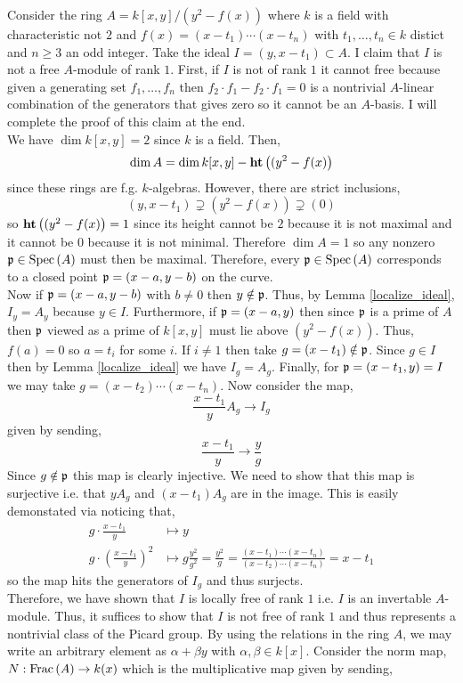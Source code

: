 \documentclass[12pt]{article}
\begin{document}
Consider the ring $A = k[x,y] / (y^2 - f(x))$ where $k$ is a field with characteristic not $2$ and $f(x) = (x - t_1) \cdots (x - t_n)$ with $t_1, \dots, t_n \in k$ distict and $n \ge 3$ an odd integer. Take the ideal $I = (y, x - t_1) \subset A$. I claim that $I$ is not a free $A$-module of rank $1$. First, if $I$ is not of rank $1$ it cannot free because given a generating set $f_1, \dots, f_n$ then $f_2 \cdot f_1 - f_2 \cdot f_1 = 0$ is a nontrivial $A$-linear combination of the generators that gives zero so it cannot be an $A$-basis. I will complete the proof of this claim at the end.
\bigskip\\
We have $\dim{k[x,y]} = 2$ since $k$ is a field. Then, 
\[ \dim{A} = \dim{k[x,y]} - \mathbf{ht}\left( (y^2 - f(x) \right) \]
since these rings are f.g. $k$-algebras. However, there are strict inclusions,
\[ (y, x - t_1) \supsetneq (y^2 - f(x)) \supsetneq (0) \]
so $\mathbf{ht}\left( (y^2 - f(x) \right) = 1$ since its height cannot be $2$ because it is not maximal and it cannot be $0$ because it is not minimal. Therefore $\dim{A} = 1$ so any nonzero $\mathfrak{p} \in \mathrm{Spec}\left( A \right)$ must then be maximal. Therefore, every $\mathfrak{p} \in \mathrm{Spec}\left( A \right)$ corresponds to a closed point $\mathfrak{p} = (x - a, y - b)$ on the curve. 
\bigskip\\
Now if $\mathfrak{p} = (x - a, y - b)$ with $b \neq 0$ then $y \notin \mathfrak{p}$. Thus, by Lemma \ref{localize_ideal}, $I_y = A_y$ because $y \in I$. Furthermore, if $\mathfrak{p} = (x - a, y)$ then since $\mathfrak{p}$ is a prime of $A$ then $\mathfrak{p}$ viewed as a prime of $k[x,y]$ must lie above $(y^2 - f(x))$. Thus, $f(a) = 0$ so $a = t_i$ for some $i$. If $i \neq 1$ then take $g = (x - t_1) \notin \mathfrak{p}$. Since $g \in I$ then by Lemma \ref{localize_ideal} we have $I_g = A_g$. Finally, for $\mathfrak{p} = (x - t_1, y) = I$ we may take $g = (x - t_2) \cdots (x - t_n)$. Now consider the map,
\[ \frac{x - t_1}{y} A_g \to I_g \]
given by sending,
\[ \frac{x - t_1}{y} \to \frac{y}{g} \]
Since $g \notin \mathfrak{p}$ this map is clearly injective. We need to show that this map is surjective i.e. that $y A_g$ and $(x - t_1) A_g$ are in the image. This is easily demonstated via noticing that,
\begin{align*}
g \cdot \frac{x - t_1}{y} & \mapsto y 
\\
g \cdot \left( \frac{x - t_1}{y} \right)^2 & \mapsto g \frac{y^2}{g^2} = \frac{y^2}{g} = \frac{(x - t_1) \cdots (x - t_n)}{(x - t_2) \cdots (x - t_n)} = x - t_1
\end{align*}
so the map hits the generators of $I_g$ and thus surjects. 
\bigskip\\
Therefore, we have shown that $I$ is locally free of rank $1$ i.e. $I$ is an invertable $A$-module. Thus, it suffices to show that $I$ is not free of rank $1$ and thus represents a nontrivial class of the Picard group. By using the relations in the ring $A$, we may write an arbitrary element as $\alpha + \beta y$ with $\alpha, \beta \in k[x]$. Consider the norm map, $N : \mathrm{Frac}\left(A\right) \to k(x)$ which is the multiplicative map given by sending,
\end{document}
